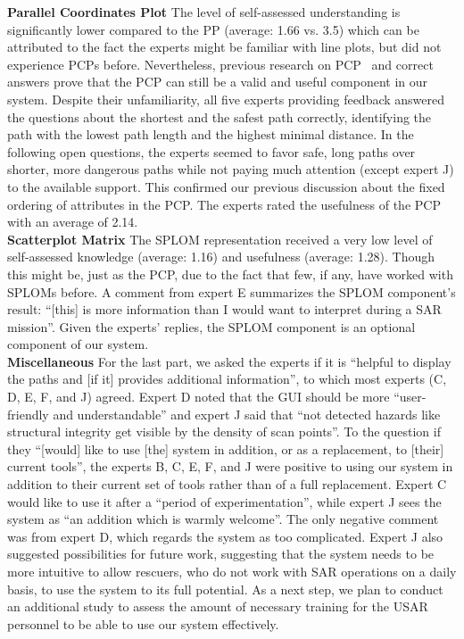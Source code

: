 \documentclass[conference,10pt,letter]{IEEEtran}
\begin{document}
%
\noindent \textbf{Parallel Coordinates Plot} The level of self-assessed understanding is significantly lower compared to the PP (average: 1.66 vs. 3.5) which can be attributed to the fact the experts might be familiar with line plots, but did not experience PCPs before. Nevertheless, previous research on PCP~\cite{CGF:CGF1666} and correct answers prove that the PCP can still be a valid and useful component in our system. Despite their unfamiliarity, all five experts providing feedback answered the questions about the shortest and the safest path correctly, identifying the path with the lowest path length and the highest minimal distance. In the following open questions, the experts seemed to favor safe, long paths over shorter, more dangerous paths while not paying much attention (except expert J) to the available support. This confirmed our previous discussion about the fixed ordering of attributes in the PCP. The experts rated the usefulness of the PCP with an average of 2.14. \\
%
\noindent \textbf{Scatterplot Matrix} The SPLOM representation received a very low level of self-assessed knowledge (average: 1.16) and usefulness (average: 1.28). Though this might be, just as the PCP, due to the fact that few, if any, have worked with SPLOMs before. A comment from expert E summarizes the SPLOM component's result: ``[this] is more information than I would want to interpret during a SAR mission''. Given the experts' replies, the SPLOM component is an optional component of our system. \\
%
\noindent \textbf{Miscellaneous} For the last part, we asked the experts if it is ``helpful to display the paths and [if it] provides additional information'', to which most experts (C, D, E, F, and J) agreed. Expert D noted that the GUI should be more ``user-friendly and understandable'' and expert J said that ``not detected hazards like structural integrity get visible by the density of scan points''. To the question if they ``[would] like to use [the] system in addition, or as a replacement, to [their] current tools'', the experts B, C, E, F, and J were positive to using our system in addition to their current set of tools rather than of a full replacement. Expert C would like to use it after a ``period of experimentation'', while expert J sees the system as ``an addition which is warmly welcome''. The only negative comment was from expert D, which regards the system as too complicated. Expert J also suggested possibilities for future work, suggesting that the system needs to be more intuitive to allow rescuers, who do not work with SAR operations on a daily basis, to use the system to its full potential. As a next step, we plan to conduct an additional study to assess the amount of necessary training for the USAR personnel to be able to use our system effectively.
\end{document}
